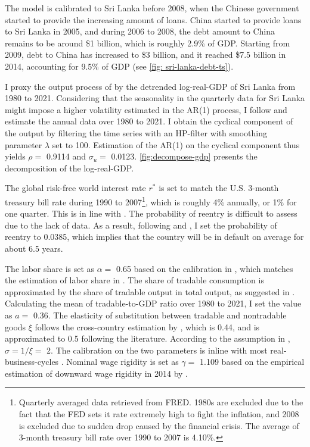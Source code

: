 The model is calibrated to Sri Lanka before 2008, when the Chinese government started to provide the increasing amount of loans.
China started to provide loans to Sri Lanka in 2005, and during 2006 to 2008, the debt amount to China remains to be around \$1 billion, which is roughly 2.9\% of GDP. Starting from 2009, debt to China has increased to \$3 billion, and it reached \$7.5 billion in 2014, accounting for 9.5\% of GDP
(see \autoref{fig: sri-lanka-debt-ts}).

I proxy the output process of  by the detrended log-real-GDP of Sri Lanka from 1980 to 2021. Considering that the seasonality in the quarterly data for Sri Lanka might impose a higher volatility estimated in the AR(1) process, I follow \citet{Hinrichsen_2020-chapter4} and estimate the annual data over 1980 to 2021. I obtain the cyclical component of the output by filtering the time series with an HP-filter with smoothing parameter $\lambda$ set to 100.
Estimation of the AR(1) on the cyclical component thus yields $\rho = $ 0.9114 and $\sigma_u = $ 0.0123\footnotemark{}. \autoref{fig:decompose-gdp} presents the decomposition of the log-real-GDP.

The global risk-free world interest rate $r^*$ is set to match the U.S. 3-month treasury bill rate during 1990 to 2007\footnote{
    Quarterly averaged data retrieved from FRED. 1980s are excluded due to the fact that the FED sets it rate extremely high to fight the inflation, and 2008 is excluded due to sudden drop caused by the financial crisis. The average of 3-month treasury bill rate over 1990 to 2007 is 4.10\%.
}, which is roughly 4\% annually, or 1\% for one quarter. This is in line with \citet{Chatterjee-12}.
The probability of reentry is difficult to assess due to the lack of data. As a result, following \citet*{Chatterjee-12} and \citet*{Hinrichsen_2020-chapter4}, I set the probability of reentry to 0.0385, which implies that the country will be in default on average for about 6.5 years.

The labor share is set as $\alpha=$ 0.65 based on the calibration in \citet*{Jegajeevan-Sri-Lanka-DSGE}, which matches the estimation of labor share in \citet{duma2007sri}. The share of tradable consumption is approximated by the share of tradable output in total output, as suggested in \citet{Uribe-Schmitt-Grohe-textbook}. Calculating the mean of tradable-to-GDP ratio over 1980 to 2021, I set the value as $a =$ 0.36. The elasticity of substitution between tradable and nontradable goods $\xi$ follows the cross-country estimation by \citet*{Stockman-Tesar-95}, which is 0.44, and is approximated to 0.5 following the literature. According to the assumption in , $\sigma=1/\xi=$ 2. The calibration on the two parameters is inline with most real-business-cycles \citep{Uribe-Schmitt-Grohe-textbook,Na-18}. Nominal wage rigidity is set as $\gamma=$ 1.109 based on the empirical estimation of downward wage rigidity in 2014 by \citet*{wage-rigidity-data}.

